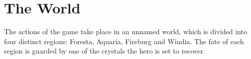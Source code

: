 \chapter{The World}

\begin{centering}
\end{centering}

The actions of the game take place in an unnamed world, which is divided into four distinct regions: Foresta, Aquaria, Fireburg and Windia. The fate of each region is guarded by one of the crystals the hero is set to recover. \\

\begin{centering}
\end{centering}





\newpage

\newpage

\newpage

\newpage


